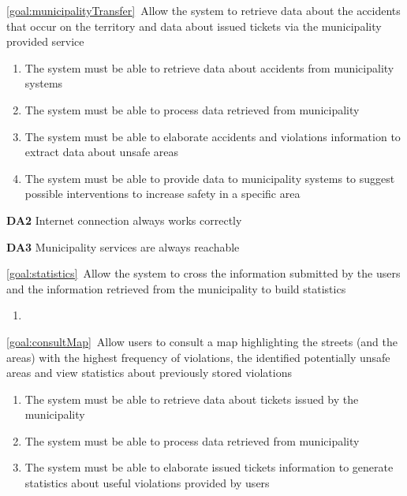 \begin{description}
  			
		
		\item \ref{goal:municipalityTransfer}\ Allow the system to retrieve data about the accidents that occur on the territory and data about issued tickets via the municipality provided service
			\begin{enumerate}[resume*]
   				\item The system must be able to retrieve data about accidents from municipality systems 
   				\item The system must be able to process data retrieved from municipality
   				\item The system must be able to elaborate accidents and violations information to extract data about unsafe areas
   				\item The system must be able to provide data to municipality systems to suggest possible interventions to increase safety in a specific area
  			\end{enumerate}
  			
  			\textbf{DA2} Internet connection always works correctly
  			
			\textbf{DA3} Municipality services are always reachable
  			
  		\item \ref{goal:statistics}\ Allow the system to cross the information submitted by the users and the information retrieved from the municipality to build statistics
  			\begin{enumerate}[resume*]
  				\item 
   				
  			\end{enumerate}
  		\item \ref{goal:consultMap}\ Allow users to consult a map highlighting the streets (and the areas) with the highest frequency of violations, the identified potentially unsafe areas and view statistics about previously stored violations
  			\begin{enumerate}[resume*] 
  				\item The system must be able to retrieve data about tickets issued by the municipality 
   				\item The system must be able to process data retrieved from municipality
   				\item The system must be able to elaborate issued tickets information to generate statistics about useful violations provided by users
   			\end{enumerate}
   			

\end{description}
